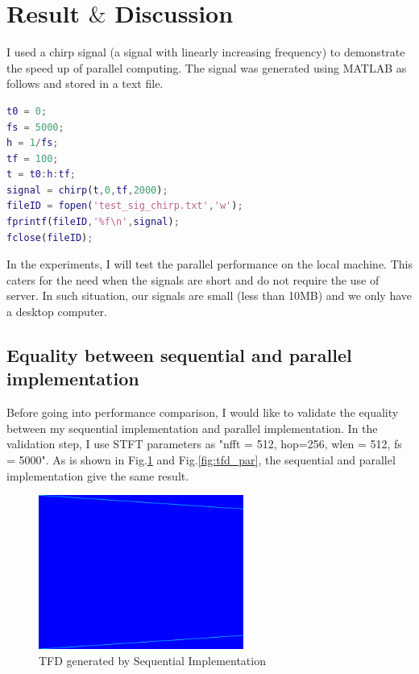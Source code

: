\documentclass[11pt,letter]{article}
\begin{document}
\section{Result $\&$ Discussion}
I used a chirp signal (a signal with linearly increasing frequency) to demonstrate the speed up of parallel computing. The signal was generated using MATLAB as follows and stored in a text file. 
\begin{lstlisting}[language=Matlab]
t0 = 0;
fs = 5000;
h = 1/fs;
tf = 100;
t = t0:h:tf;
signal = chirp(t,0,tf,2000);
fileID = fopen('test_sig_chirp.txt','w');
fprintf(fileID,'%f\n',signal);
fclose(fileID);
\end{lstlisting}

In the experiments, I will test the parallel performance on the local machine. This caters for the need when the signals are short and do not require the use of server. In such situation, our signals are small (less than 10MB) and we only have a desktop computer.

\subsection{Equality between sequential and parallel implementation}
Before going into performance comparison, I would like to validate the equality between my sequential implementation and parallel implementation. In the validation step, I use STFT parameters as "nfft = 512, hop=256, wlen = 512, fs = 5000". As is shown in Fig.\ref{fig:tfd_seq} and Fig.\ref{fig:tfd_par}, the sequential and parallel implementation give the same result.

\begin{figure}[H]
\centering
\includegraphics[width = 0.6\textwidth]{fig/tfd_seq.png}
\caption{TFD generated by Sequential Implementation}
\label{fig:tfd_seq}
\end{figure}
\end{document}
